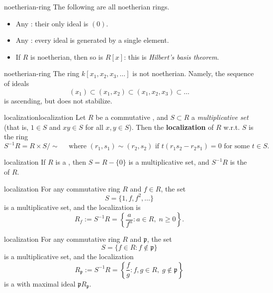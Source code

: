 \begin{example}{noetherian-ring}
    The following are all noetherian rings.
    \begin{itemize}
        \item Any : their only ideal is $(0)$.
        \item Any : every ideal is generated by a single element.
        \item If $R$ is noetherian, then so is $R[x]$: this is \textit{Hilbert's basis theorem}.
    \end{itemize}
\end{example}

\begin{example}{noetherian-ring}
    The ring $k[x_1, x_2, x_3, \ldots]$ is not noetherian. Namely, the sequence of ideals
    \[ (x_1) \subset (x_1, x_2) \subset (x_1, x_2, x_3) \subset \ldots \]
    is ascending, but does not stabilize.
\end{example}

\begin{topic}{localization}{localization}
    Let $R$ be a commutative , and $S \subset R$ a \textit{multiplicative set} (that is, $1 \in S$ and $xy \in S$ for all $x, y \in S$). Then the \textbf{localization} of $R$ w.r.t. $S$ is the ring
    \[ S^{-1} R = R \times S / \sim{} \quad \text{ where } (r_1, s_1) \sim{} (r_2, s_2) \text{ if } t(r_1 s_2 - r_2 s_1) = 0 \text{ for some } t \in S . \]
\end{topic}

\begin{example}{localization}
    If $R$ is a , then $S = R - \{ 0 \}$ is a multiplicative set, and $S^{-1} R$ is the  of $R$.
\end{example}

\begin{example}{localization}
    For any commutative ring $R$ and $f \in R$, the set
    \[ S = \{ 1, f, f^2, \ldots \} \]
    is a multiplicative set, and the localization is
    \[ R_f := S^{-1} R = \left\{ \frac{a}{f^n} : a \in R, \; n \ge 0 \right\} . \]
\end{example}

\begin{example}{localization}
    For any commutative ring $R$ and  $\mathfrak{p}$, the set
    \[ S = \{ f \in R : f \not\in \mathfrak{p} \} \]
    is a multiplicative set, and the localization
    \[ R_\mathfrak{p} := S^{-1} R = \left\{ \frac{f}{g} : f, g \in R, \; g \not\in \mathfrak{p} \right\} \]
    is a  with maximal ideal $\mathfrak{p} R_\mathfrak{p}$.
\end{example}


